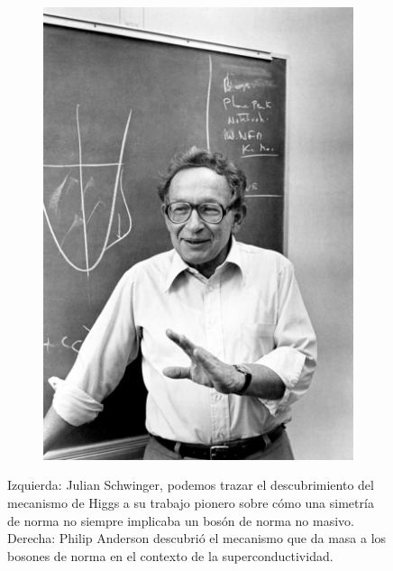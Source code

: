 \begin{figure}
\begin{subfigure}{0.5\textwidth}
	\centering	
\includegraphics[trim = {1cm 1cm 4cm 12cm},clip,scale=0.25]{images/anderson.jpg}
		\end{subfigure}
\caption{Izquierda: Julian Schwinger, podemos trazar el descubrimiento
del mecanismo de Higgs a su trabajo pionero sobre c\'omo una simetr\'ia de norma no siempre implicaba un bos\'on de norma no masivo. Derecha: Philip Anderson descubri\'o el mecanismo que da
masa a los bosones de norma en el contexto de la superconductividad.}
	\end{figure}

